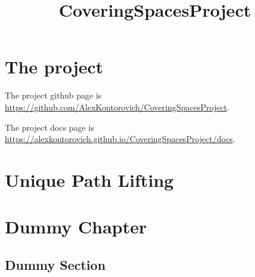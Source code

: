 \usepackage{amsmath, amsthm}
\usepackage{hyperref}

\theoremstyle{definition}
\newtheorem{definition}{Definition}
\newtheorem{theorem}{Theorem}
\newtheorem{proposition}{Proposition}
\newtheorem{lemma}{Lemma}
\newtheorem{corollary}{Corollary}

\title{CoveringSpacesProject}

\newcommand{\eps}{\epsilon}

\newcommand{\R}{\mathbb{R}}
\newcommand{\Q}{\mathbb{Q}}
\newcommand{\C}{\mathbb{C}}
\newcommand{\Z}{\mathbb{Z}}
\newcommand{\N}{\mathbb{N}}



\maketitle

\chapter{The project}

The project github page is \url{https://github.com/AlexKontorovich/CoveringSpacesProject}.

The project docs page is \url{https://alexkontorovich.github.io/CoveringSpacesProject/docs}.

\chapter{Unique Path Lifting}


\chapter{Dummy Chapter}
\section{Dummy Section}




